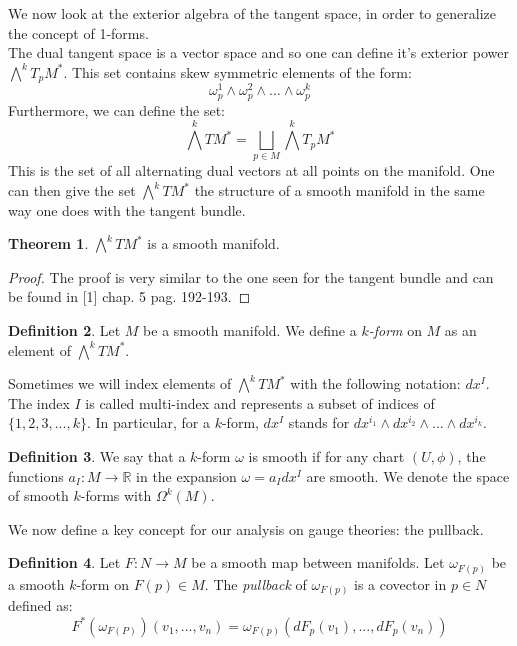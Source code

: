 \documentclass[12pt,a4paper]{report}
\theoremstyle{definition}
\newtheorem{Def}{Definition}[chapter]
\theoremstyle{Theorem}
\newtheorem{Theo}[Def]{Theorem}
\theoremstyle{definition}
\theoremstyle{definition}
\begin{document}
	We now look at the exterior algebra of the tangent space, in order to generalize the concept of 1-forms.\\
	The dual tangent space is a vector space and so one can define it's exterior power $\bigwedge^k T_pM^*$. This set contains skew symmetric elements of the form:
	$$\omega^1_p\wedge \omega^2_p\wedge...\wedge \omega^k_p$$
	Furthermore, we can define the set:
	$$\bigwedge^k TM^*=\bigsqcup_{p\in M}\bigwedge^k T_pM^*$$
	This is the set of all alternating dual vectors at all points on the manifold. One can then give the set $\bigwedge^k TM^*$ the structure  of a smooth manifold in the same way one does with the tangent bundle.
	\begin{Theo}
		$\bigwedge^kTM^*$ is a smooth manifold.
	\end{Theo}
	\begin{proof}
		The proof is very similar to the one seen for the tangent bundle and can be found in [1] chap. 5 pag. 192-193.
	\end{proof}
	\begin{Def}
		Let $M$ be a smooth manifold. We define a \textit{$k$-form} on $M$ as an element of $\bigwedge^k TM^*$. 
	\end{Def}
	Sometimes we will index elements of $\bigwedge^k TM^*$ with the following notation: $dx^I$. The index $I$ is called multi-index and represents a subset of indices of $\{1,2,3,...,k\}$. In particular, for a $k$-form, $dx^I$ stands for $dx^{i_1}\wedge dx^{i_2}\wedge...\wedge dx^{i_k}$.
	\begin{Def}
		We say that a $k$-form $\omega$ is smooth if for any chart $(U,\phi)$, the functions $a_I:M\rightarrow \mathbb{R}$ in the expansion $\omega=a_Idx^I$ are smooth.
		We denote the space of smooth $k$-forms with $\Omega^k(M)$. 
	\end{Def}
	We now define a key concept for our analysis on gauge theories: the pullback.
	\begin{Def}
		Let $F:N\rightarrow M$ be a smooth map between manifolds.
		Let $\omega_{F(p)}$ be a smooth $k$-form on $F(p)\in M$. The \textit{pullback} of $\omega_{F(p)}$ is a covector in $p\in N$ defined as:
		$$F^*(\omega_{F(P)})(v_1,...,v_n)=\omega_{F(p)}(dF_p(v_1),...,dF_p(v_n))$$ 
	\end{Def}
\end{document}
